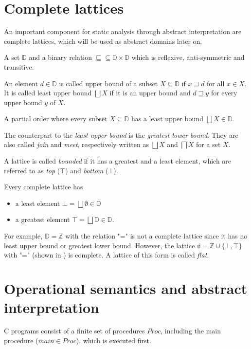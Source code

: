 \section{Complete lattices}
An important component for static analysis through abstract interpretation are complete lattices, which will be used as abstract domains later on.
\begin{definition}
A set $\mathbb{D}$ and a binary relation $\sqsubseteq \subseteq \mathbb{D} \times \mathbb{D}$ which is reflexive, anti-symmetric and transitive.
\end{definition}
\begin{definition}
An element $d \in \mathbb{D}$ is called upper bound of a subset $X \subseteq \mathbb{D}$ if $x \sqsupseteq d$ for all $x \in X$.
It is called least upper bound $\bigsqcup X$ if it is an upper bound and $d \sqsupseteq y$ for every upper bound $y$ of $X$.
\end{definition}
\begin{definition}
A partial order where every subset $X \subseteq \mathbb{D}$ has a least upper bound $\bigsqcup X \in \mathbb{D}$.
\end{definition}
The counterpart to the \textit{least upper bound} is the \textit{greatest lower bound}. They are also called \textit{join} and \textit{meet}, respectively written as $\bigsqcup X$ and $\bigsqcap X$ for a set $X$.

A lattice is called \textit{bounded} if it has a greatest and a least element, which are referred to as \textit{top} ($\top$) and \textit{bottom} ($\bot$).

Every complete lattice has
\begin{itemize}
\item a least element $\bot = \bigsqcup \emptyset \in \mathbb{D}$
\item a greatest element $\top = \bigsqcup \mathbb{D} \in \mathbb{D}$.
\end{itemize}

For example, $\mathbb{D} = \mathbb{Z}$ with the relation "=" is not a complete lattice since it has no least upper bound or greatest lower bound. However, the lattice $\mathbb{d} = \mathbb{Z} \cup \{\bot, \top\}$ with "=" (shown in ) is complete. A lattice of this form is called \textit{flat}.



\section{Operational semantics and abstract interpretation}
\label{sec:OpSem&AbsInt}
C programs consist of a finite set of procedures $Proc$, including the main procedure ($main \in Proc$), which is executed first.

